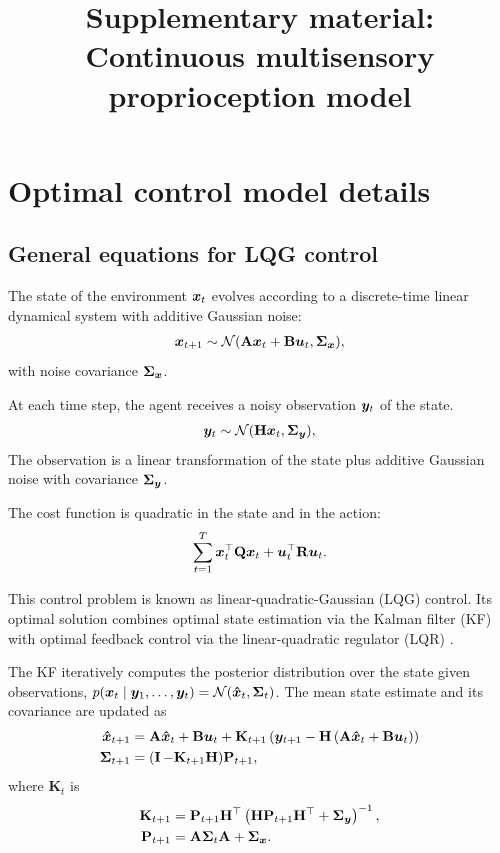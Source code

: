 \documentclass{article}
\title{Supplementary material: Continuous multisensory proprioception model}
\begin{document}
\maketitle

\section{Optimal control model details}
\subsection{General equations for LQG control}
    The state of the environment ${\bm x}_t$ evolves according to a discrete-time linear dynamical system with additive Gaussian noise:
\begin{align}\label{eq:dynamics}
    {\bm x}_{t+1} \sim \operatorname{\mathcal{N}}(\mathbf A {\bm x}_t + \mathbf B {\bm u}_t, \mathbf \Sigma_{\bm x}),
\end{align}
with noise covariance $\mathbf \Sigma_{\bm x}$.

At each time step, the agent receives a noisy observation ${\bm y}_t$ of the state.
\begin{align}\label{eq:obsmodel}
    {\bm y}_t \sim \operatorname{\mathcal{N}}(\mathbf H {\bm x}_t, \mathbf \Sigma_{\bm y}),
\end{align}
The observation is a linear transformation of the state plus additive Gaussian noise with covariance $\mathbf \Sigma_{\bm y}$.

The cost function is quadratic in the state and in the action:
\begin{align}\label{eq:quadratic-cost}
    \sum_{t=1}^T {\bm x}_t^\top \mathbf Q {\bm x}_t + {\bm u}_t^\top \mathbf R {\bm u}_t.
\end{align}

This control problem is known as linear-quadratic-Gaussian (LQG) control. Its optimal solution combines optimal state estimation via the Kalman filter (KF) \citep{kalman1960new} with optimal feedback control via the linear-quadratic regulator (LQR) \citep{kalman1960contributions}.

The KF iteratively computes the posterior distribution over the state given observations, $p({\bm x}_t \mid {\bm y}_{1}, \dots, {\bm y}_t)=\mathcal{N}({\bm{\hat x}}_t, \mathbf \Sigma_t)$. The mean state estimate and its covariance are updated as
\begin{align}
    {\bm{\hat x}}_{t+1} &= \mathbf A {\bm{\hat x}}_t + \mathbf B {\bm u}_t + \mathbf K_{t+1} \left({\bm y}_{t+1} - \mathbf H \left(\mathbf A {\bm{\hat x}}_t + \mathbf B {\bm u}_t\right)\right) \\
    \mathbf \Sigma_{t+1} &= (\operatorname{{\mathbf{I}}} - \mathbf K_{t+1} \mathbf H) \mathbf P_{t+1},
\end{align}
where $\mathbf K_t$ is
\begin{align}
    \mathbf K_{t+1} &= \mathbf P_{t+1} \mathbf H^\top \left(\mathbf H \mathbf P_{t+1} \mathbf H^\top + \mathbf \Sigma_{\bm y} \right)^{-1}, \\
    \mathbf P_{t+1} &= \mathbf A \mathbf \Sigma_{t} \mathbf A + \mathbf \Sigma_{\bm x}. \\
\end{align}
\end{document}
